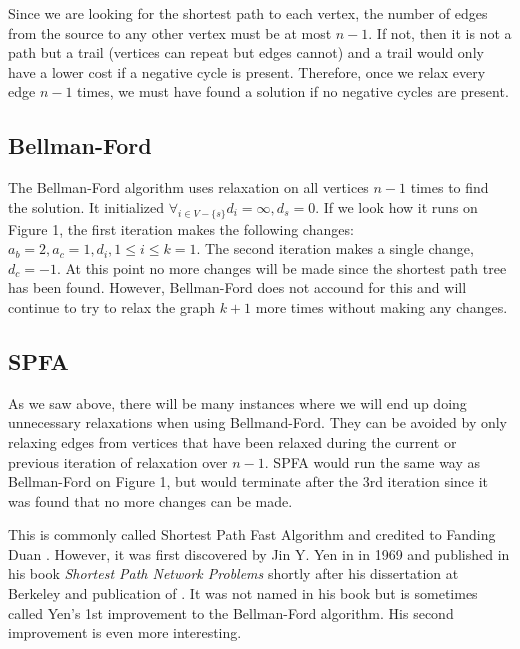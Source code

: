 \documentclass{article}
\begin{document}
Since we are looking for the shortest path to each vertex, the number of edges from the source to any other vertex must be at most $n-1$. If not, then it is not a path but a trail (vertices can repeat but edges cannot) and a trail would only have a lower cost if a negative cycle is present. Therefore, once we relax every edge $n-1$ times, we must have found a solution if no negative cycles are present.

\subsection{Bellman-Ford}
The Bellman-Ford algorithm \cite{BF, BF 2} uses relaxation on all vertices $n-1$ times to find the solution. It initialized $\forall_{i\in V-\{s\}} d_i = \infty, d_s = 0$. If we look how it runs on Figure 1, the first iteration makes the following changes: $a_b = 2, a_c = 1, d_{i}, 1 \leq i \leq k = 1$. The second iteration makes a single change, $d_c = -1$. At this point no more changes will be made since the shortest path tree has been found. However, Bellman-Ford does not accound for this and will continue to try to relax the graph $k+1$ more times without making any changes.

\subsection{SPFA}
As we saw above, there will be many instances where we will end up doing unnecessary relaxations when using Bellmand-Ford. They can be avoided by only relaxing edges from vertices that have been relaxed during the current or previous iteration of relaxation over $n-1$. SPFA would run the same way as Bellman-Ford on Figure 1, but would terminate after the 3rd iteration since it was found that no more changes can be made.

This is commonly called Shortest Path Fast Algorithm and credited to Fanding Duan \cite{SPFA}. However, it was first discovered by Jin Y. Yen in in 1969 \cite{Yen2} and published in his book \textit{Shortest Path Network Problems} shortly after his dissertation at Berkeley and publication of \cite{Yen1}. It was not named in his book but is sometimes called Yen's 1st improvement to the Bellman-Ford algorithm. His second improvement is even more interesting.
\end{document}
